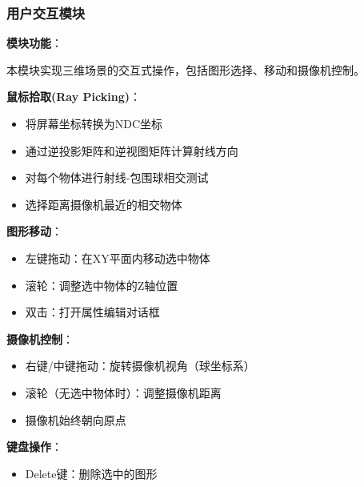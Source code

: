 \documentclass[12pt,a4paper]{article}
\begin{document}
\begin{tcolorbox}
\subsubsection{用户交互模块}

\textbf{模块功能}：

本模块实现三维场景的交互式操作，包括图形选择、移动和摄像机控制。

\textbf{鼠标拾取(Ray Picking)}：
\begin{itemize}
    \item 将屏幕坐标转换为NDC坐标
    \item 通过逆投影矩阵和逆视图矩阵计算射线方向
    \item 对每个物体进行射线-包围球相交测试
    \item 选择距离摄像机最近的相交物体
\end{itemize}

\textbf{图形移动}：
\begin{itemize}
    \item 左键拖动：在XY平面内移动选中物体
    \item 滚轮：调整选中物体的Z轴位置
    \item 双击：打开属性编辑对话框
\end{itemize}

\textbf{摄像机控制}：
\begin{itemize}
    \item 右键/中键拖动：旋转摄像机视角（球坐标系）
    \item 滚轮（无选中物体时）：调整摄像机距离
    \item 摄像机始终朝向原点
\end{itemize}

\textbf{键盘操作}：
\begin{itemize}
    \item Delete键：删除选中的图形
\end{itemize}
\end{tcolorbox}

\clearpage
\end{document}
